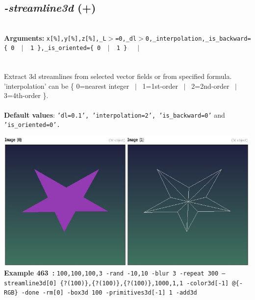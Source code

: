 \documentclass[a4paper,11pt,twoside]{book}
\begin{document}
\subsection{\emph{-streamline3d} (+)}\vspace*{-0.5em}
~\\\textbf{Arguments: } 
{\small \texttt{x[\%],y[\%],z[\%],\_L$>$=0,\_dl$>$0,\_interpolation,\_is\_backward=\{ 0 ~$|$~ 1 \},\_is\_oriented=\{ 0 ~$|$~ 1 \}}}~~~$|$\\
\\~\\
Extract 3d streamlines from selected vector fields or from specified formula.
~\\'interpolation' can be \{ 0=nearest integer ~$|$~ 1=1st-order ~$|$~ 2=2nd-order ~$|$~ 3=4th-order \}.
~\\~\\\textbf{Default values}: {\small \texttt{'dl=0.1', 'interpolation=2', 'is\_backward=0'} and \texttt{'is\_oriented=0'.}}
\begin{center}\includegraphics[keepaspectratio=true,height=7cm,width=\textwidth]{img/gmic_def463.jpg}\\
{\footnotesize \textbf{Example 463~:} \texttt{100,100,100,3 -rand -10,10 -blur 3 -repeat 300 --streamline3d[0] \{?(100)\},\{?(100)\},\{?(100)\},1000,1,1 -color3d[-1] @\{-RGB\} -done -rm[0] -box3d 100 -primitives3d[-1] 1 -add3d}}
\end{center}
\end{document}
